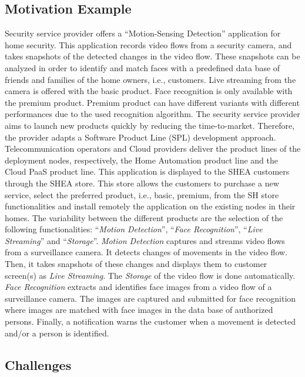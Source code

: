 \documentclass{llncs}
\begin{document}
\subsection{Motivation Example}
Security service provider offers a ``Motion-Sensing Detection'' application for home security. This application records video flows from a security camera, and takes snapshots of the detected changes in the video flow. These snapshots can be analyzed in order to identify and match faces with a predefined data base of friends and families of the home owners, i.e., customers. Live streaming from the camera is offered with the basic product. Face recognition is only available with the premium product. Premium product can have different variants with different performances due to the used recognition algorithm. The security service provider aims to launch new products quickly by reducing the time-to-market. Therefore, the provider adapts a Software Product Line (SPL) development approach. %
\\
Telecommunication operators and Cloud providers deliver the product lines of the deployment nodes, respectively, the Home Automation product line and the Cloud PaaS product line. This application is displayed to the SHEA customers through the SHEA store. This store allows the customers to purchase a new service, select the preferred product, i.e., basic, premium, from the SH store functionalities and install remotely the application on the existing nodes in their homes. The variability between the different products are the selection of the following functionalities: ``\textit{Motion Detection}'', ``\textit{Face Recognition}'', ``\textit{Live Streaming}'' and ``\textit{Storage}''. \textit{Motion Detection} captures and streams video flows from a surveillance camera. It detects changes of movements in the video flow. Then, it takes snapshots of these changes and displays them to customer screen(s) as \textit{Live Streaming}. The \textit{Storage} of the video flow is done automatically. \textit{Face Recognition} extracts and identifies face images from a video flow of a surveillance camera. The images are captured and submitted for face recognition where images are matched with face images in the data base of authorized persons. Finally, a notification warns the customer when a movement is detected and/or a person is identified.
\subsection{Challenges}\label{subsec:challenges}
\end{document}
